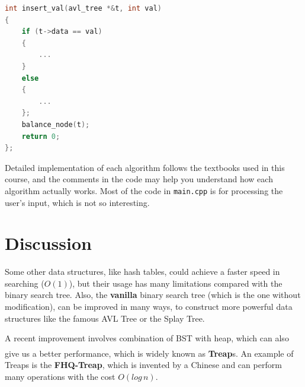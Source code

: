 \documentclass[cn,black,12pt,normal]{elegantnote}
\newcommand{\uct}[1]{\textsuperscript{\textsuperscript{\cite{#1}}}}
\begin{document}
\begin{lstlisting}[language = C++]
int insert_val(avl_tree *&t, int val)
{
	if (t->data == val)
	{
        ...
	}
	else
	{
        ...
	};
	balance_node(t);
	return 0;
};
\end{lstlisting}

Detailed implementation of each algorithm follows the textbooks used in this course, and the comments in the code may help you understand how each algorithm actually works. Most of the code in \lstinline{main.cpp} is for processing the user's input, which is not so interesting.

\section{Discussion}

Some other data structures, like hash tables, could achieve a faster speed in searching ($O(1)$), but their usage has many limitations compared with the binary search tree. Also, the \textbf{vanilla} binary search tree (which is the one without modification), can be improved in many ways, to construct more powerful data structures like the famous AVL Tree or the Splay Tree.

A recent improvement involves combination of BST with heap, which can also give us a better performance, which is widely known as \textbf{Treap}s.\uct{yi2005research} An example of Treaps is the \textbf{FHQ-Treap}, which is invented by a Chinese and can perform many operations with the cost $O(log\, n)$.

\newpage

\end{document}
